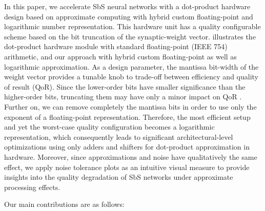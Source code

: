 In this paper, we accelerate SbS neural networks with a dot-product hardware design based on approximate computing with hybrid custom floating-point and logarithmic number representation. This hardware unit has a quality configurable scheme based on the bit truncation of the synaptic-weight vector.  illustrates the dot-product hardware module with standard floating-point (IEEE 754) arithmetic, and our approach with hybrid custom floating-point as well as logarithmic approximation. As a design parameter, the mantissa bit-width of the weight vector provides a tunable knob to trade-off between efficiency and quality of result (QoR)\cite{park2009dynamic, han2013approximate}. Since the lower-order bits have smaller significance than the higher-order bits, truncating them may have only a minor impact on QoR \cite{gupta2011impact, mittal2016survey}. Further on, we can remove completely the mantissa bits in order to use only the exponent of a floating-point representation. Therefore, the most efficient setup and yet the worst-case quality configuration becomes a logarithmic representation, which consequently leads to significant architectural-level optimizations using only adders and shifters for dot-product approximation in hardware. Moreover, since approximations and noise have qualitatively the same effect\cite{venkataramani2015approximate}, we apply noise tolerance plots as an intuitive visual measure to provide insights into the quality degradation of SbS networks under approximate processing effects.

Our main contributions are as follows:

